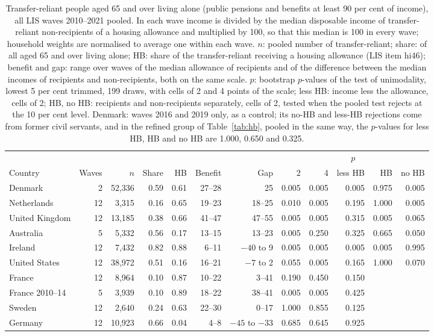 \begin{table}[t]
\centering\footnotesize
\caption{Transfer-reliant people aged 65 and over living alone (public pensions and benefits at least 90 per cent of income), all LIS waves 2010--2021 pooled. In each wave income is divided by the median disposable income of transfer-reliant non-recipients of a housing allowance and multiplied by 100, so that this median is 100 in every wave; household weights are normalised to average one within each wave. $n$: pooled number of transfer-reliant; share: of all aged 65 and over living alone; HB: share of the transfer-reliant receiving a housing allowance (LIS item hi46); benefit and gap: range over waves of the median allowance of recipients and of the difference between the median incomes of recipients and non-recipients, both on the same scale. $p$: bootstrap $p$-values of the test of unimodality, lowest 5 per cent trimmed, 199 draws, with cells of 2 and 4 points of the scale; less HB: income less the allowance, cells of 2; HB, no HB: recipients and non-recipients separately, cells of 2, tested when the pooled test rejects at the 10 per cent level. Denmark: waves 2016 and 2019 only, as a control; its no-HB and less-HB rejections come from former civil servants, and in the refined group of Table~\ref{tab:hb}, pooled in the same way, the $p$-values for less HB, HB and no HB are 1.000, 0.650 and 0.325.}\label{tab:pool}
\setlength{\tabcolsep}{3pt}
\begin{tabular}{lrrrrrrrrrrr}
\toprule
 & & & & & & & \multicolumn{5}{c}{$p$}\\
\cmidrule(lr){8-12}
Country & Waves & $n$ & Share & HB & Benefit & Gap & 2 & 4 & less HB & HB & no HB\\
\midrule
Denmark & 2 & 52{,}336 & 0.59 & 0.61 & 27--28 & 25 & 0.005 & 0.005 & 0.005 & 0.975 & 0.005\\
Netherlands & 12 & 3{,}315 & 0.16 & 0.65 & 19--23 & 18--25 & 0.010 & 0.005 & 0.195 & 1.000 & 0.005\\
United Kingdom & 12 & 13{,}185 & 0.38 & 0.66 & 41--47 & 47--55 & 0.005 & 0.005 & 0.315 & 0.005 & 0.065\\
Australia & 5 & 5{,}332 & 0.56 & 0.17 & 13--15 & 13--23 & 0.005 & 0.250 & 0.325 & 0.665 & 0.050\\
Ireland & 12 & 7{,}432 & 0.82 & 0.88 & 6--11 & $-40$ to 9 & 0.005 & 0.005 & 0.005 & 0.005 & 0.995\\
United States & 12 & 38{,}972 & 0.51 & 0.16 & 16--21 & $-7$ to 2 & 0.055 & 0.005 & 0.165 & 1.000 & 0.070\\
France & 12 & 8{,}964 & 0.10 & 0.87 & 10--22 & 3--41 & 0.190 & 0.450 & 0.150 & & \\
France 2010--14 & 5 & 3{,}939 & 0.10 & 0.89 & 18--22 & 38--41 & 0.005 & 0.005 & 0.425 & & \\
Sweden & 12 & 2{,}640 & 0.24 & 0.63 & 22--30 & 0--17 & 1.000 & 0.855 & 0.125 & & \\
Germany & 12 & 10{,}923 & 0.66 & 0.04 & 4--8 & $-45$ to $-33$ & 0.685 & 0.645 & 0.925 & & \\
\bottomrule
\end{tabular}
\end{table}
